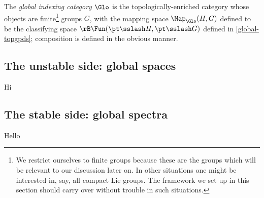 \begin{definition}
  \label{global-indexcat-dfn}
  The \emph{global indexing category} $\Glo$ is the
  topologically-enriched category whose objects are finite\footnote{We
    restrict ourselves to finite groups because these are the groups
    which will be relevant to our discussion later on. In other
    situations one might be interested in, say, all compact Lie
    groups. The framework we set up in this section should carry over
    without trouble in such situations.} groups $G$, with the mapping
  space $\Map_{\Glo}(H,G)$ defined to be the classifying space
  $\rB \Fun(\pt \sslash H, \pt \sslash G)$ defined in
  \cref{global-topgpds}; composition is defined in the obvious manner.
\end{definition}

\subsection{The unstable side: global spaces}
\label{global-unstable}

Hi

\subsection{The stable side: global spectra}
\label{global-stable}

Hello